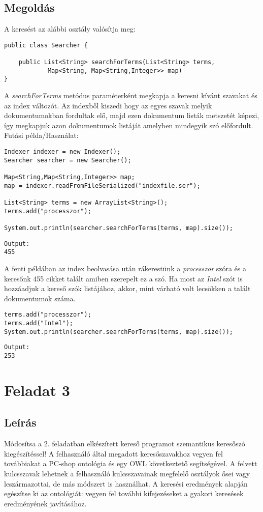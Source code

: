 \subsection{Megoldás}
A keresést az alábbi osztály valósítja meg:
\begin{lstlisting}[frame=single,float=!ht]
public class Searcher {

	public List<String> searchForTerms(List<String> terms,
			Map<String, Map<String,Integer>> map) 
}
\end{lstlisting}
A \emph{searchForTerms} metódus paraméterként megkapja a keresni kívánt szavakat és az index változót. Az indexből kiszedi hogy az egyes szavak melyik dokumentumokban fordultak elő, majd ezen dokumentum listák metszetét képezi, így megkapjuk azon dokumentumok listáját amelyben mindegyik szó előfordult.
Futási példa/Használat:
\begin{lstlisting}[frame=single,float=!ht]
Indexer indexer = new Indexer();
Searcher searcher = new Searcher();

Map<String,Map<String,Integer>> map;
map = indexer.readFromFileSerialized("indexfile.ser");

List<String> terms = new ArrayList<String>();
terms.add("processzor");

System.out.println(searcher.searchForTerms(terms, map).size());
\end{lstlisting}
\begin{lstlisting}[frame=single,float=!ht]
Output:
455
\end{lstlisting}
A fenti példában az index beolvasása után rákerestünk a \emph{processzor} szóra és a keresőnk 455 cikket talált amiben szerepelt ez a szó. Ha most az \emph{Intel} szót is hozzáadjuk a kereső szók listájához, akkor, mint várható volt lecsökken a talált dokumentumok száma.
\begin{lstlisting}[frame=single,float=!ht]
terms.add("processzor");
terms.add("Intel");
System.out.println(searcher.searchForTerms(terms, map).size());
\end{lstlisting}
\begin{lstlisting}[frame=single,float=!ht]
Output:
253
\end{lstlisting}

\section{Feladat 3}
\subsection{Leírás}
Módosítsa a 2. feladatban elkészített kereső programot szemantikus keresőszó kiegészítéssel! A felhasználó által megadott keresőszavakhoz vegyen fel továbbiakat a PC-shop ontológia és egy OWL következtető segítségével. A felvett kulcsszavak lehetnek a felhasználó kulcsszavainak megfelelő osztályok ősei vagy leszármazottai, de más módszert is használhat.
A keresési eredmények alapján egészítse ki az ontológiát: vegyen fel további kifejezéseket a gyakori keresések eredményének javításához.

